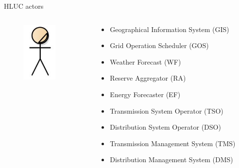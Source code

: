   \begin{frame}{HLUC actors}

    \begin{columns}

      \begin{column}{0.3\textwidth}
        \begin{figure}\centering
        \includegraphics[height=3cm]{Data/actors.png}
      \end{figure}
      \end{column}

  \begin{column}{0.69\textwidth}
    \begin{itemize}
      \item Geographical Information System (GIS)
      \item Grid Operation Scheduler (GOS)
      \item Weather Forecast (WF)
      \item Reserve Aggregator (RA)
      \item Energy Forecaster (EF)
      \item Transmission System Operator (TSO)
      \item Distribution System Operator (DSO)
      \item Transmission Management System (TMS)
      \item Distribution Management System (DMS)
    \end{itemize}
      \end{column}

    \end{columns}

  \end{frame}

